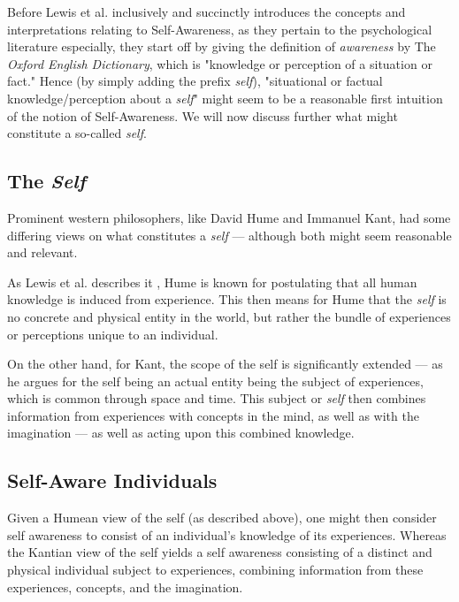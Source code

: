 	Before Lewis et al. \cite{sacs16_ch2} inclusively and succinctly introduces the concepts and interpretations relating to Self-Awareness, as they pertain to the psychological literature especially, they start off by giving the definition of \textit{awareness} by The \textit{Oxford English Dictionary}, which is "knowledge or perception of a situation or fact." Hence (by simply adding the prefix \textit{self}), "situational or factual knowledge/perception about a \textit{self}" might seem to be a reasonable first intuition of the notion of Self-Awareness. We will now discuss further what might constitute a so-called \textit{self}.


	\subsection{The \textit{Self}}

	Prominent western philosophers, like David Hume and Immanuel Kant, had some differing views on what constitutes a \textit{self} — although both might seem reasonable and relevant. 

	As Lewis et al. describes it \cite{sacs16_ch2}, Hume is known for postulating that all human knowledge is induced from experience. This then means for Hume that the \textit{self} is no concrete and physical entity in the world, but rather the bundle of experiences or perceptions unique to an individual.

	On the other hand, for Kant, the scope of the self is significantly extended — as he argues for the self being an actual entity being the subject of experiences, which is common through space and time. This subject or \textit{self} then combines information from experiences with concepts in the mind, as well as with the imagination — as well as acting upon this combined knowledge.


	\subsection{Self-Aware Individuals}

	Given a Humean view of the self (as described above), one might then consider self awareness to consist of an individual's knowledge of its experiences. Whereas the Kantian view of the self yields a self awareness consisting of a distinct and physical individual subject to experiences, combining information from these experiences, concepts, and the imagination.

